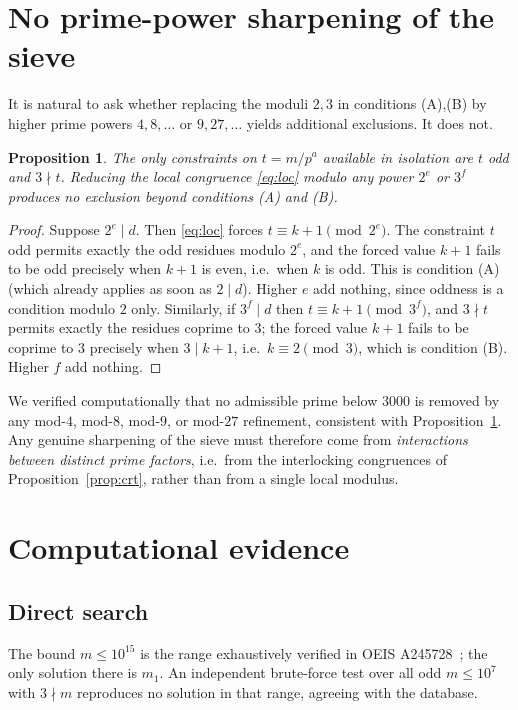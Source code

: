 \documentclass[11pt,reqno]{amsart}
\theoremstyle{plain}
\newtheorem{proposition}{Proposition}
\theoremstyle{definition}
\theoremstyle{remark}
\begin{document}
\section{No prime-power sharpening of the sieve}\label{sec:nosharp}

It is natural to ask whether replacing the moduli $2,3$ in conditions (A),(B) by higher prime
powers $4,8,\dots$ or $9,27,\dots$ yields additional exclusions. It does not.

\begin{proposition}\label{prop:nosharp}
The only constraints on $t=m/p^{a}$ available in isolation are $t$ odd and $3\nmid t$. Reducing
the local congruence \eqref{eq:loc} modulo any power $2^{e}$ or $3^{f}$ produces no exclusion
beyond conditions \textup{(A)} and \textup{(B)}.
\end{proposition}

\begin{proof}
Suppose $2^{e}\mid d$. Then \eqref{eq:loc} forces $t\equiv k+1\pmod{2^{e}}$. The constraint
$t$ odd permits exactly the odd residues modulo $2^{e}$, and the forced value $k+1$ fails to be
odd precisely when $k+1$ is even, i.e.\ when $k$ is odd. This is condition (A) (which already
applies as soon as $2\mid d$). Higher $e$ add nothing, since oddness is a condition modulo $2$
only. Similarly, if $3^{f}\mid d$ then $t\equiv k+1\pmod{3^{f}}$, and $3\nmid t$ permits exactly
the residues coprime to $3$; the forced value $k+1$ fails to be coprime to $3$ precisely when
$3\mid k+1$, i.e.\ $k\equiv 2\pmod 3$, which is condition (B). Higher $f$ add nothing.
\end{proof}

We verified computationally that no admissible prime below $3000$ is removed by any mod-$4$,
mod-$8$, mod-$9$, or mod-$27$ refinement, consistent with Proposition~\ref{prop:nosharp}. Any
genuine sharpening of the sieve must therefore come from \emph{interactions between distinct
prime factors}, i.e.\ from the interlocking congruences of Proposition~\ref{prop:crt}, rather
than from a single local modulus.

\section{Computational evidence}\label{sec:comp}

\subsection{Direct search}
The bound $m\le 10^{15}$ is the range exhaustively verified in OEIS A245728~\cite{oeis}; the only
solution there is $m_{1}$. An independent brute-force test over all odd $m\le 10^{7}$ with
$3\nmid m$ reproduces no solution in that range, agreeing with the database.
\end{document}
